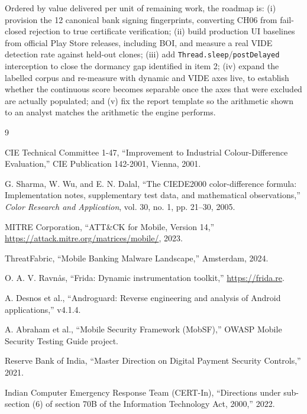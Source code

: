 \documentclass{article}
\begin{document}
Ordered by value delivered per unit of remaining work, the roadmap is:
(i) provision the 12 canonical bank signing fingerprints, converting CH06 from
fail-closed rejection to true certificate verification; (ii) build production UI
baselines from official Play Store releases, including BOI, and measure a real
VIDE detection rate against held-out clones; (iii) add
\texttt{Thread.sleep}/\texttt{postDelayed} interception to close the dormancy
gap identified in item 2; (iv) expand the labelled corpus and re-measure with
dynamic and VIDE axes live, to establish whether the continuous score becomes
separable once the axes that were excluded are actually populated; and (v) fix
the report template so the arithmetic shown to an analyst matches the arithmetic
the engine performs.

\begin{thebibliography}{9}

CIE Technical Committee 1-47,
``Improvement to Industrial Colour-Difference Evaluation,''
CIE Publication 142-2001, Vienna, 2001.

G. Sharma, W. Wu, and E. N. Dalal,
``The CIEDE2000 color-difference formula: Implementation notes, supplementary
test data, and mathematical observations,''
\textit{Color Research and Application}, vol. 30, no. 1, pp. 21--30, 2005.

MITRE Corporation,
``ATT\&CK for Mobile, Version 14,''
\url{https://attack.mitre.org/matrices/mobile/}, 2023.

ThreatFabric,
``Mobile Banking Malware Landscape,'' Amsterdam, 2024.

O. A. V. Ravn\aa s, ``Frida: Dynamic instrumentation toolkit,''
\url{https://frida.re}.

A. Desnos et al., ``Androguard: Reverse engineering and analysis of Android
applications,'' v4.1.4.

A. Abraham et al., ``Mobile Security Framework (MobSF),''
OWASP Mobile Security Testing Guide project.

Reserve Bank of India,
``Master Direction on Digital Payment Security Controls,'' 2021.

Indian Computer Emergency Response Team (CERT-In),
``Directions under sub-section (6) of section 70B of the Information Technology
Act, 2000,'' 2022.

\end{thebibliography}
\end{document}
